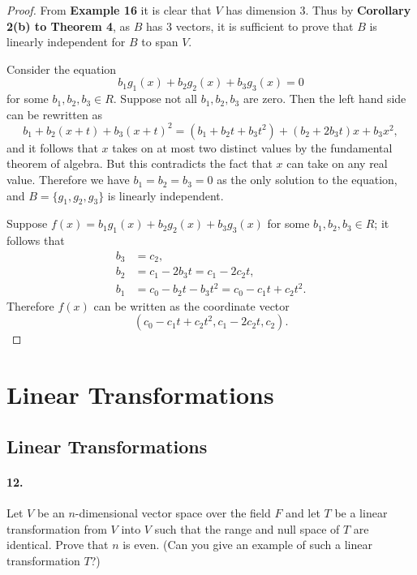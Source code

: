\documentclass{article}
\begin{document}
\begin{proof}
  From \textbf{Example 16} it is clear that $V$ has dimension 3. Thus by
  \textbf{Corollary 2(b) to Theorem 4}, as $B$ has 3 vectors, it is sufficient
  to prove that $B$ is linearly independent for $B$ to span $V$.

  Consider the equation \[
    b_1g_1(x) + b_2g_2(x) + b_3g_3(x) = 0
  \] for some $b_1, b_2, b_3 \in R$. Suppose not all $b_1, b_2, b_3$ are zero.
  Then the left hand side can be rewritten as \[
    b_1 + b_2(x + t) + b_3(x + t)^2 = (b_1 + b_2t + b_3t^2) + (b_2 + 2b_3t)x +
    b_3x^2,
  \] and it follows that $x$ takes on at most two distinct values by the
  fundamental theorem of algebra. But this contradicts the fact that $x$ can
  take on any real value. Therefore we have $b_1 = b_2 = b_3 = 0$ as the only
  solution to the equation, and $B = \{g_1, g_2, g_3\}$ is linearly independent.

  Suppose $f(x) = b_1g_1(x) + b_2g_2(x) + b_3g_3(x)$ for some $b_1, b_2, b_3 \in
  R$; it follows that
  \begin{align*}
    b_3 &= c_2, \\
    b_2 &= c_1 - 2b_3t = c_1 - 2c_2t, \\
    b_1 &= c_0 - b_2t - b_3t^2 = c_0 - c_1t + c_2t^2.
  \end{align*}
  Therefore $f(x)$ can be written as the coordinate vector \[
    (c_0 - c_1t + c_2t^2, c_1 - 2c_2t, c_2).
  \]
\end{proof}

\section{Linear Transformations}

\subsection{Linear Transformations}

\paragraph{12.} Let $V$ be an $n$-dimensional vector space over the field $F$
and let $T$ be a linear transformation from $V$ into $V$ such that the range and
null space of $T$ are identical. Prove that $n$ is even. (Can you give an
example of such a linear transformation $T$?)
\end{document}
